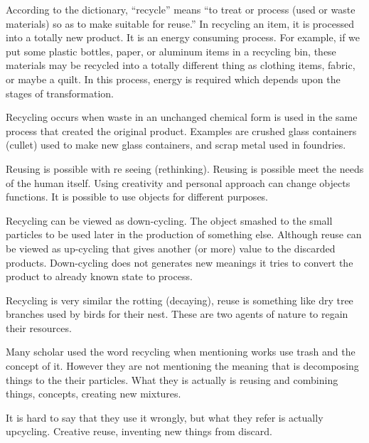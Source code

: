 According to the dictionary, “recycle” means “to treat or process (used or waste materials) so as to make suitable for reuse.” In recycling an item, it is processed into a totally new product. It is an energy consuming process. For example, if we put some plastic bottles, paper, or aluminum items in a recycling bin, these materials may be recycled into a totally different thing as clothing items, fabric, or maybe a quilt. In this process, energy is required which depends upon the stages of transformation.

Recycling occurs when waste in an unchanged chemical form is used in the same process that created the original product. Examples are crushed glass containers (cullet) used to make new glass containers, and scrap metal used in foundries. 

Reusing is possible with re seeing (rethinking). Reusing is possible meet the needs of the human itself. Using creativity and personal approach can change objects functions. It is possible to use objects for different purposes. 

Recycling can be viewed as down-cycling. The object smashed to the small particles to be used later in the production of something else. Although reuse can be viewed as up-cycling that gives another (or more) value to the discarded products. Down-cycling does not generates new meanings it tries to convert the product to already known state to process. 

Recycling is very similar the rotting (decaying), reuse is something like dry tree branches used by birds for their nest. These are two agents of nature to regain their resources.

Many scholar used the word recycling when mentioning works use trash and the concept of it. However they are not mentioning the meaning that is decomposing things to the their particles. What they is actually is reusing and combining things, concepts, creating new mixtures.

It is hard to say that they use it wrongly, but what they refer is actually upcycling. Creative reuse, inventing new things from discard.


